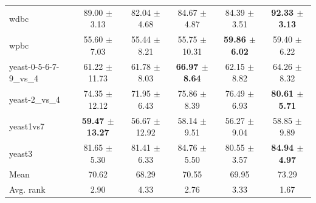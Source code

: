 \begin{table}[t]
\begin{tabular}{lccccc}
wdbc & 89.00 $\pm$ 3.13 & 82.04 $\pm$ 4.68 & 84.67 $\pm$ 4.87 & 84.39 $\pm$ 3.51 & \textbf{92.33 $\pm$ 3.13} \\
wpbc & 55.60 $\pm$ 7.03 & 55.44 $\pm$ 8.21 & 55.75 $\pm$ 10.31 & \textbf{59.86 $\pm$ 6.02} & 59.40 $\pm$ 6.22 \\
yeast-0-5-6-7-9\_vs\_4 & 61.22 $\pm$ 11.73 & 61.78 $\pm$ 8.03 & \textbf{66.97 $\pm$ 8.64} & 62.15 $\pm$ 8.82 & 64.26 $\pm$ 8.32 \\
yeast-2\_vs\_4 & 74.35 $\pm$ 12.12 & 71.95 $\pm$ 6.43 & 75.86 $\pm$ 8.39 & 76.49 $\pm$ 6.93 & \textbf{80.61 $\pm$ 5.71} \\
yeast1vs7 & \textbf{59.47 $\pm$ 13.27} & 56.67 $\pm$ 12.92 & 58.14 $\pm$ 9.51 & 56.27 $\pm$ 9.04 & 58.85 $\pm$ 9.89 \\
yeast3 & 81.65 $\pm$ 5.30 & 81.41 $\pm$ 6.33 & 84.76 $\pm$ 5.50 & 80.55 $\pm$ 3.57 & \textbf{84.94 $\pm$ 4.97} \\
\midrule
Mean & 70.62 & 68.29 & 70.55 & 69.95 & 73.29 \\
Avg. rank & 2.90 & 4.33 & 2.76 & 3.33 & 1.67 \\
\bottomrule
\end{tabular}
\end{table}